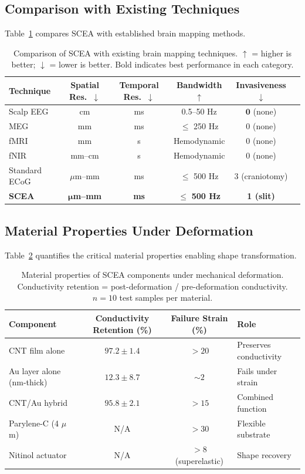 \documentclass[11pt]{article}
\begin{document}
\subsection{Comparison with Existing Techniques}

Table~\ref{tab:comparison} compares SCEA with established brain mapping methods.

\begin{table}[H]
\centering
\caption{Comparison of SCEA with existing brain mapping techniques. $\uparrow$ = higher is better; $\downarrow$ = lower is better. Bold indicates best performance in each category.}
\label{tab:comparison}
\begin{tabular}{lccccc}
\toprule
\textbf{Technique} & \textbf{Spatial Res.\ $\downarrow$} & \textbf{Temporal Res.\ $\downarrow$} & \textbf{Bandwidth $\uparrow$} & \textbf{Invasiveness $\downarrow$} \\
\midrule
Scalp EEG & cm & ms & 0.5--50 Hz & $\mathbf{0}$ (none) \\
MEG & mm & ms & $\leq$ 250 Hz & 0 (none) \\
fMRI & mm & s & Hemodynamic & 0 (none) \\
fNIR & mm--cm & s & Hemodynamic & 0 (none) \\
Standard ECoG & $\mu$m--mm & ms & $\leq$ 500 Hz & 3 (craniotomy) \\
\textbf{SCEA} & $\boldsymbol{\mu}$\textbf{m--mm} & \textbf{ms} & $\boldsymbol{\leq}$ \textbf{500 Hz} & \textbf{1 (slit)} \\
\bottomrule
\end{tabular}
\end{table}

\subsection{Material Properties Under Deformation}

Table~\ref{tab:materials} quantifies the critical material properties enabling shape transformation.

\begin{table}[H]
\centering
\caption{Material properties of SCEA components under mechanical deformation. Conductivity retention = post-deformation / pre-deformation conductivity. $n = 10$ test samples per material.}
\label{tab:materials}
\begin{tabular}{lccl}
\toprule
\textbf{Component} & \textbf{Conductivity Retention (\%)} & \textbf{Failure Strain (\%)} & \textbf{Role} \\
\midrule
CNT film alone & $97.2 \pm 1.4$ & $> 20$ & Preserves conductivity \\
Au layer alone (nm-thick) & $12.3 \pm 8.7$ & $\sim 2$ & Fails under strain \\
CNT/Au hybrid & $95.8 \pm 2.1$ & $> 15$ & Combined function \\
Parylene-C (4 $\mu$m) & N/A & $> 30$ & Flexible substrate \\
Nitinol actuator & N/A & $> 8$ (superelastic) & Shape recovery \\
\bottomrule
\end{tabular}
\end{table}
\end{document}
